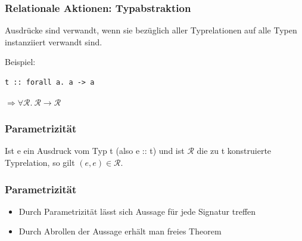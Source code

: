 \documentclass{beamer}
\begin{document}

\begin{frame}[fragile]
\frametitle{Relationale Aktionen: Typabstraktion}

Ausdrücke sind verwandt, wenn sie bezüglich aller Typrelationen auf alle Typen instanziiert verwandt sind.

\pause
\vspace{36px}

Beispiel:

\begin{verbatim}
t :: forall a. a -> a
\end{verbatim}

\pause

$\Rightarrow \forall \mathcal{R}.~ \mathcal{R} \rightarrow \mathcal{R}$
\end{frame}


\begin{frame}
\frametitle{Parametrizität}

\begin{Theorem}[Parametrizität]
Ist e ein Ausdruck vom Typ t (also e :: t) und ist $\mathcal{R}$ die zu t konstruierte Typrelation, so gilt
$(e, e) \in \mathcal{R}$.
\end{Theorem}

\end{frame}


\begin{frame}
\frametitle{Parametrizität}

\begin{itemize}
\item Durch Parametrizität lässt sich Aussage für jede Signatur treffen
\item Durch Abrollen der Aussage erhält man freies Theorem
\end{itemize}

\end{frame}

\end{document}
